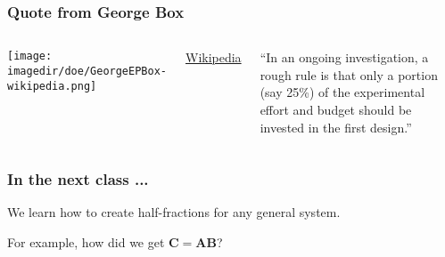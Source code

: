 \begin{frame}\frametitle{Quote from George Box}
	\begin{columns}[T]
			\texttt{[image: \\imagedir/doe/GeorgeEPBox-wikipedia.png]}
		
			{\tiny \href{https://en.wikiquote.org/wiki/George\_E.\_P.\_Box}{Wikipedia}}
		
			``In an ongoing investigation, a rough rule is that only a portion (say 25\%) of the experimental effort and budget should be invested in the first design.''
	\end{columns}	
\end{frame}

\begin{frame}\frametitle{In the next class ...}
	We learn how to create half-fractions for any general system.
	
	\vspace{2cm}
	For example, how did we get $\mathbf{C = AB}$?
\end{frame}

